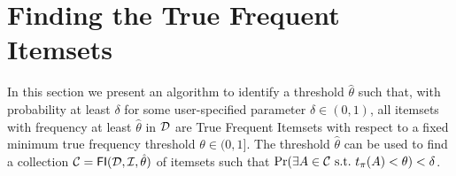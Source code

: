\section{Finding the True Frequent Itemsets}\label{sec:main}
In this section we present an algorithm to identify a threshold $\hat{\theta}$ such
that, with probability at least $\delta$ for some user-specified parameter
$\delta\in(0,1)$, all itemsets with frequency at least $\hat{\theta}$ in ${\cal D}$
are True Frequent Itemsets with respect to a fixed minimum true frequency
threshold $\theta\in(0,1]$. %
The threshold $\hat{\theta}$ can be used to find a collection
$\mathcal{C}=\mathsf{FI}({\cal D},{\cal I},\hat\theta)$ of itemsets such that $\Pr(\exists
A\in\mathcal{C} \mbox{ s.t.~} t_\pi(A)<\theta)<\delta$.

\iffalse
It starts by building a set
$\mathcal{G}$ of ``candidates TFIs''. For each itemset
$A\in\mathcal{G}$ we evaluate the probability that $\tfreq(A)$ is less than $\theta$
by considering the probability that  $f(A)$ of $A$ in
the dataset is observed when $\tfreq(A) < \theta$. If
the frequency falls into the \emph{acceptance region} %
$[0,\theta+\varepsilon)$, where $\varepsilon$ is a function of $\delta$ and
$\mathcal{G}$ computed by our methods,
then $H_A$ is \emph{accepted}, otherwise $H_A$ is \emph{rejected}
and $A$ is flagged as True Frequent and included in the output collection
$\mathcal{C}$. Any
itemset not in $\mathcal{G}$ is not considered and will not
be reported in output. It should be clear that the definition of the acceptance
region is critical for the method to have the desired FWER at most
$\delta$: one needs to compute an $\varepsilon$ such that 
\[ 
\Pr\left(\exists A\in\mathcal{C}\mbox{ s.t. } \tfreq(A)<\theta\right)=\Pr\left(\exists A\in\mathcal{G} \mbox{ s.t. } \tfreq(A)<\theta \mbox{ and }
f(A)\ge\theta+\varepsilon\right)\le\delta\enspace.\]
\fi



